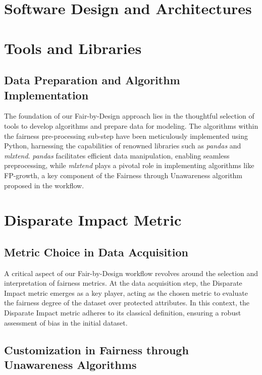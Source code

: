 \documentclass[12pt,a4paper,openright,twoside]{book}
\begin{document}
\section{Software Design and Architectures}


\section{Tools and Libraries}

\subsection{Data Preparation and Algorithm Implementation}

The foundation of our Fair-by-Design approach lies in the thoughtful selection of tools to develop algorithms and prepare data for modeling. The algorithms within the fairness pre-processing sub-step have been meticulously implemented using Python, harnessing the capabilities of renowned libraries such as \emph{pandas} and \emph{mlxtend}. \emph{pandas} facilitates efficient data manipulation, enabling seamless preprocessing, while \emph{mlxtend} plays a pivotal role in implementing algorithms like FP-growth, a key component of the Fairness through Unawareness algorithm proposed in the workflow.

\section{Disparate Impact Metric}

\subsection{Metric Choice in Data Acquisition}

A critical aspect of our Fair-by-Design workflow revolves around the selection and interpretation of fairness metrics. At the data acquisition step, the Disparate Impact metric emerges as a key player, acting as the chosen metric to evaluate the fairness degree of the dataset over protected attributes. In this context, the Disparate Impact metric adheres to its classical definition, ensuring a robust assessment of bias in the initial dataset.

\subsection{Customization in Fairness through Unawareness Algorithms}
\end{document}
